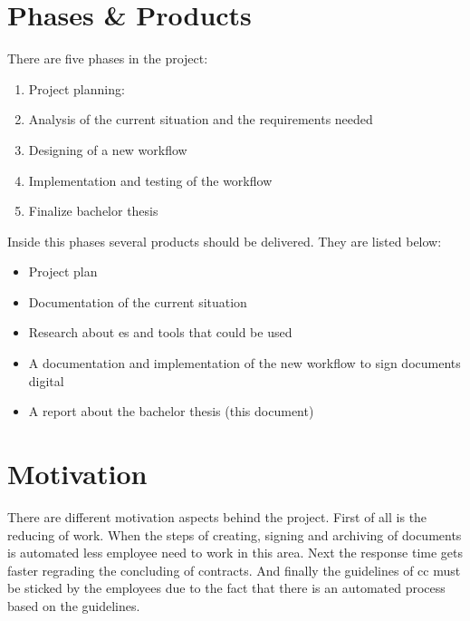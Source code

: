  \section{Phases \& Products} \label{sec:phases}
 There are five phases in the project:
 \begin{enumerate}
 	\item Project planning:
 	\item Analysis of the current situation and the requirements needed
 	\item Designing of a new workflow
 	\item Implementation and testing of the workflow
 	\item Finalize bachelor thesis
 \end{enumerate}
 
 Inside this phases several products should be delivered. They are listed below:
 \begin{itemize}
 	\item Project plan
 	\item Documentation of the current situation
 	\item Research about \gls{es} and tools that could be used
 	\item A documentation and implementation of the new workflow to sign documents digital
 	\item A report about the bachelor thesis (this document)
 \end{itemize}
 
 
 \section{Motivation}
 There are different motivation aspects behind the project. First of all is the reducing of work. When the steps of creating, signing and archiving of documents is automated less employee need to work in this area. Next the response time gets faster regrading the concluding of contracts. And finally the guidelines of \gls{cc} must be sticked by the employees due to the fact that there is an automated process based on the guidelines. 
